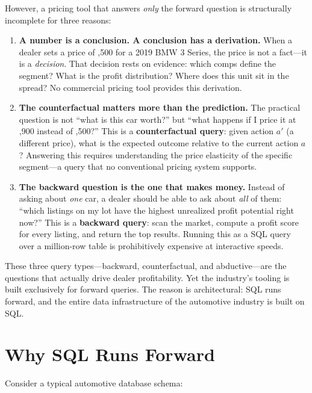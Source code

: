 \documentclass[11pt,a4paper,twoside]{book}
\begin{document}
However, a pricing tool that answers \textit{only} the forward question is structurally incomplete
for three reasons:

\begin{enumerate}[leftmargin=*]
    \item \textbf{A number is a conclusion. A conclusion has a derivation.} When a dealer sets a
          price of ,500 for a 2019 BMW 3 Series, the price is not a fact---it is a
          \textit{decision}. That decision rests on evidence: which comps define the segment? What
          is the profit distribution? Where does this unit sit in the spread? No commercial pricing
          tool provides this derivation.
    \item \textbf{The counterfactual matters more than the prediction.} The practical question is
          not ``what is this car worth?'' but ``what happens if I price it at ,900
          instead of ,500?''  This is a \textbf{counterfactual query}: given action
          $a'$ (a different price), what is the expected outcome relative to the current action
          $a$?  Answering this requires understanding the price elasticity of the specific
          segment---a query that no conventional pricing system supports.
    \item \textbf{The backward question is the one that makes money.} Instead of asking about
          \textit{one} car, a dealer should be able to ask about \textit{all} of them: ``which
          listings on my lot have the highest unrealized profit potential right now?'' This is a
          \textbf{backward query}: scan the market, compute a profit score for every listing, and
          return the top results. Running this as a SQL query over a million-row table is
          prohibitively expensive at interactive speeds.
\end{enumerate}

These three query types---backward, counterfactual, and abductive---are the questions that
actually drive dealer profitability. Yet the industry's tooling is built exclusively for forward
queries. The reason is architectural: SQL runs forward, and the entire data infrastructure of the
automotive industry is built on SQL.

\section{Why SQL Runs Forward}

Consider a typical automotive database schema:
\end{document}
